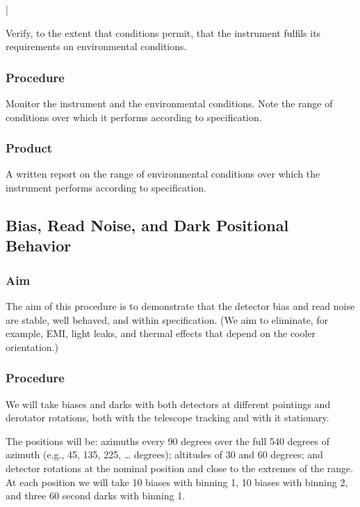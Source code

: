 |\documentclass{article}
\begin{document}
Verify, to the extent that conditions permit, that the instrument fulfils its requirements on environmental conditions.

\subsubsection{Procedure}

Monitor the instrument and the environmental conditions. Note the range of conditions over which it performs according to specification.

\subsubsection{Product}

A written report on the range of environmental conditions over which the instrument performs according to specification.


\subsection{Bias, Read Noise, and Dark Positional Behavior}

\subsubsection{Aim}

The aim of this procedure is to demonstrate that the detector bias and read noise are stable, well behaved, and within specification. (We aim to eliminate, for example, EMI, light leaks, and thermal effects that depend on the cooler orientation.)

\subsubsection{Procedure}

We will take biases and darks with both detectors at different pointings and derotator rotations, both with the telescope tracking and with it stationary.

The positions will be: azimuths every 90 degrees over the full 540 degrees of azimuth (e.g., 45, 135, 225, {\ldots} degrees); altitudes of 30 and 60 degrees; and detector rotations at the nominal position and close to the extremes of the range. At each position we will take 10 biases with binning 1, 10 biases with binning 2, and three 60 second darks with binning 1.
\end{document}
